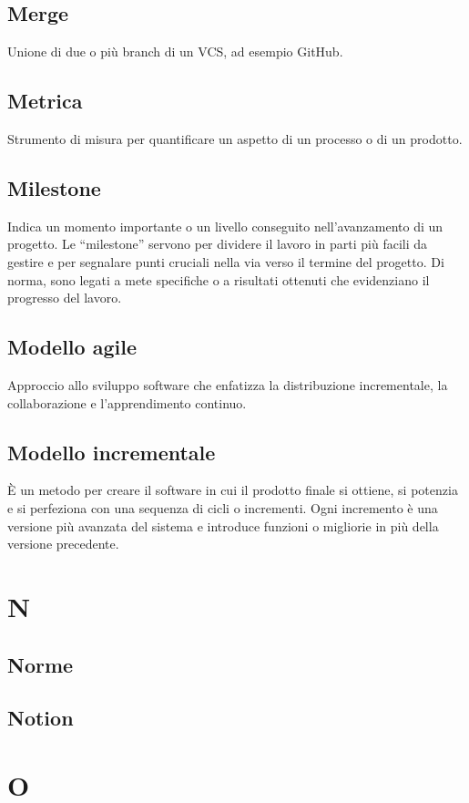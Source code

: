 \documentclass[12pt]{article}
\begin{document}
		\subsection{Merge}
			Unione di due o più branch di un VCS, ad esempio GitHub.
		\subsection{Metrica}
			Strumento di misura per quantificare un aspetto di un processo o di un prodotto.
		\subsection{Milestone}
			Indica un momento importante o un livello conseguito nell’avanzamento di un progetto. Le “milestone” servono per dividere il lavoro in parti più facili da gestire e per segnalare punti cruciali nella via verso il termine del progetto. Di norma, sono legati a mete specifiche o a risultati ottenuti che evidenziano il progresso del lavoro.
		\subsection{Modello agile}
			Approccio allo sviluppo software che enfatizza la distribuzione incrementale, la collaborazione e l'apprendimento continuo.

		\subsection{Modello incrementale}
			È un metodo per creare il software in cui il prodotto finale si ottiene, si potenzia e si perfeziona con una sequenza di cicli o incrementi. Ogni incremento è una versione più avanzata del sistema e introduce funzioni o migliorie in più della versione precedente.

	\clearpage
	\section{N}
		\subsection{Norme}
		\subsection{Notion}
	\clearpage
	\section{O}
	\clearpage
\end{document}
